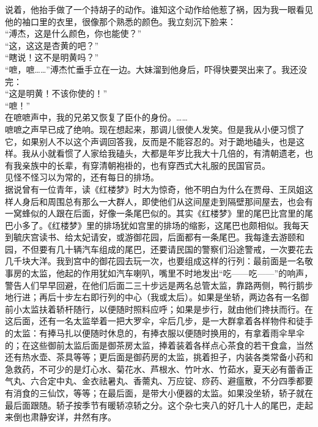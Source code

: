 说着，他抬手做了一个持胡子的动作。谁知这个动作给他惹了祸，因为我一眼看见他的袖口里的衣里，很像那个熟悉的颜色。我立刻沉下脸来：\\

“溥杰，这是什么颜色，你也能使？”\\

“这，这这是杏黄的吧？”\\

“瞎说！这不是明黄吗？”\\

“嗻，嗻……”溥杰忙垂手立在一边。大妹溜到他身后，吓得快要哭出来了。我还没完：\\

“这是明黄！不该你使的！”\\

“嗻！”\\

在嗻嗻声中，我的兄弟又恢复了臣仆的身份。……\\

嗻嗻之声早已成了绝响。现在想起来，那调儿很使人发笑。但是我从小便习惯了它，如果别人不以这个声调回答我，反而是不能容忍的。对于跪地磕头，也是这样。我从小就看惯了人家给我磕头，大都是年岁比我大十几倍的，有清朝遗老，也有我亲族中的长辈，有穿清朝袍褂的，也有穿西式大礼服的民国官员。\\

见怪不怪习以为常的，还有每日的排场。\\

据说曾有一位青年，读《红楼梦》时大为惊奇，他不明白为什么在贾母、王凤姐这样人身后和周围总有那么一大群人，即使他们从这间屋走到隔壁那间屋去，也会有一窝蜂似的人跟在后面，好像一条尾巴似的。其实《红楼梦》里的尾巴比宫里的尾巴小多了。《红楼梦》里的排场犹如宫里的排场的缩影，这尾巴也颇相似。我每天到毓庆宫读书、给太妃请安，或游御花园，后面都有一条尾巴。我每逢去游颐和园，不但要有几十辆汽车组成的尾巴，还要请民国的警察们沿途警戒，一次要花去几千块大洋。我到宫中的御花园去玩一次，也要组成这样的行列：最前面是一名敬事房的太监，他起的作用犹如汽车喇叭，嘴里不时地发出“吃——吃——”的响声，警告人们早早回避，在他们后面二三十步远是两名总管太监，靠路两侧，鸭行鹅步地行进；再后十步左右即行列的中心（我或太后）。如果是坐轿，两边各有一名御前小太监扶着轿杆随行，以便随时照料应呼；如果是步行，就由他们搀扶而行。在这后面，还有一名太监举着一把大罗伞，伞后几步，是一大群拿着各样物件和徒手的太监：有捧马扎以便随时休息的，有捧衣服以便随时换用的，有拿着雨伞旱伞的；在这些御前太监后面是御茶房太监，捧着装着各样点心茶食的若干食盒，当然还有热水壶、茶具等等；更后面是御药房的太监，挑着担子，内装各类常备小药和急救药，不可少的是灯心水、菊花水、芦根水、竹叶水、竹茹水，夏天必有蕾香正气丸、六合定中丸、金衣祛暑丸、香薷丸、万应锭、痧药、避瘟散，不分四季都要有消食的三仙饮，等等；在最后面，是带大小便器的太监。如果没坐轿，轿子就在最后面跟随。轿子按季节有暖轿凉轿之分。这个杂七夹八的好几十人的尾巴，走起来倒也肃静安详，井然有序。\\

